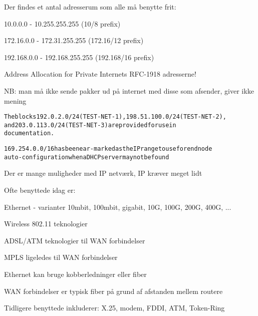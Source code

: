 \documentclass[Screen16to9,17pt]{foils}
\begin{document}

\begin{list1}
\item Der findes et antal adresserum som alle må benytte frit:
\begin{list2}
\item 10.0.0.0    -  10.255.255.255  (10/8 prefix)
\item 172.16.0.0  -  172.31.255.255  (172.16/12 prefix)
\item 192.168.0.0 -  192.168.255.255 (192.168/16 prefix)
\end{list2}
\item Address Allocation for Private Internets RFC-1918 adresserne!
\item NB: man må ikke sende pakker ud på internet med disse som afsender, giver ikke mening
\end{list1}

\begin{alltt}
The blocks 192.0.2.0/24 (TEST-NET-1), 198.51.100.0/24 (TEST-NET-2),
and 203.0.113.0/24 (TEST-NET-3) are provided for use in
documentation.

169.254.0.0/16 has been ear-marked as the IP range to use for end node
auto-configuration when a DHCP server may not be found
\end{alltt}





\begin{list1}
\item Der er mange muligheder med IP netværk, IP kræver meget lidt
\item Ofte benyttede idag er:
\begin{list2}
\item Ethernet - varianter 10mbit, 100mbit, gigabit, 10G, 100G, 200G, 400G, ...
\item Wireless 802.11 teknologier
\item ADSL/ATM teknologier til WAN forbindelser
\item MPLS ligeledes til WAN forbindelser
\end{list2}
\item Ethernet kan bruge kobberledninger eller fiber
\item WAN forbindelser er typisk fiber på grund af afstanden mellem routere
\item Tidligere benyttede inkluderer: X.25, modem, FDDI, ATM, Token-Ring
\end{list1}
\end{document}

